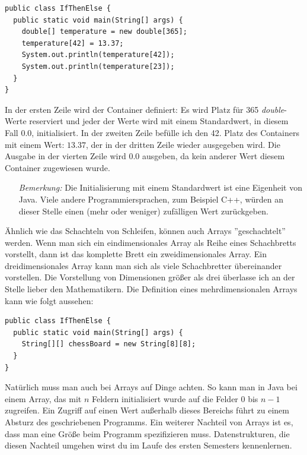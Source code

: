 \begin{minipage}{\textwidth}
\begin{lstlisting}
public class IfThenElse {
  public static void main(String[] args) {
    double[] temperature = new double[365];
    temperature[42] = 13.37;
    System.out.println(temperature[42]);
    System.out.println(temperature[23]);
  }
}
\end{lstlisting}	
\end{minipage}

In der ersten Zeile wird der Container definiert: Es wird Platz für 365 \textit{double}-Werte reserviert und jeder der Werte wird mit einem Standardwert, in diesem Fall $0.0$, initialisiert. In der zweiten Zeile befülle ich den 42. Platz des Containers mit einem Wert: $13.37$, der in der dritten Zeile wieder ausgegeben wird. Die Ausgabe in der vierten Zeile wird $0.0$ ausgeben, da kein anderer Wert diesem Container zugewiesen wurde.

\begin{itemize}
	\item[\textit{Bemerkung:}] Die Initialisierung mit einem Standardwert ist eine Eigenheit von Java. Viele andere Programmiersprachen, zum Beispiel C++, würden an dieser Stelle einen (mehr oder weniger) zufälligen Wert zurückgeben.
\end{itemize}

Ähnlich wie das Schachteln von Schleifen, können auch Arrays ''geschachtelt'' werden. Wenn man sich ein eindimensionales Array als Reihe eines Schachbretts vorstellt, dann ist das komplette Brett ein zweidimensionales Array. Ein dreidimensionales Array kann man sich als viele Schachbretter übereinander vorstellen. Die Vorstellung von Dimensionen größer als drei überlasse ich an der Stelle lieber den Mathematikern. Die Definition eines mehrdimensionalen Arrays kann wie folgt aussehen:

\begin{minipage}{\textwidth}
\begin{lstlisting}
public class IfThenElse {
  public static void main(String[] args) {
    String[][] chessBoard = new String[8][8];
  }
}
\end{lstlisting}	
\end{minipage}

Natürlich muss man auch bei Arrays auf Dinge achten. So kann man in Java bei einem Array, das mit $n$ Feldern initialisiert wurde auf die Felder $0$ bis $n-1$ zugreifen. Ein Zugriff auf einen Wert außerhalb dieses Bereichs führt zu einem Absturz des geschriebenen Programms. Ein weiterer Nachteil von Arrays ist es, dass man eine Größe beim Programm spezifizieren muss. Datenstrukturen, die diesen Nachteil umgehen wirst du im Laufe des ersten Semesters kennenlernen.

